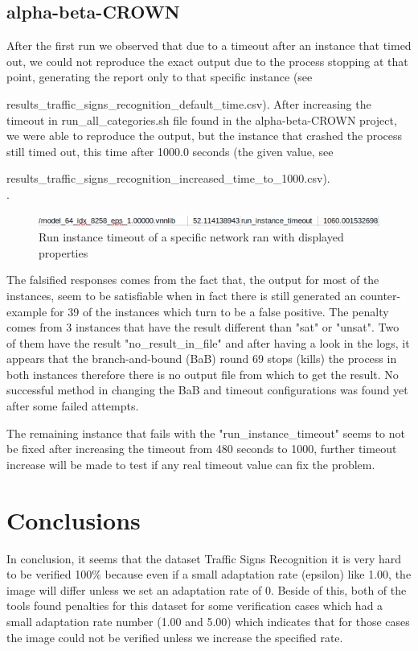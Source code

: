 \documentclass[12pt,a4paper]{report}
\newcommand\tab[1][5mm]{\hspace*{#1}}
\begin{document}
\section{alpha-beta-CROWN}
\tab After the first run we observed that due to a timeout after an instance that timed out, we could not reproduce the exact output due to the process stopping at that point, generating the report only to that specific instance (see

results\_traffic\_signs\_recognition\_default\_time.csv\cite{traffic_signs_recognition_first_solution}). After increasing the timeout in run\_all\_categories.sh file found in the alpha-beta-CROWN project, we were able to reproduce the output, but the instance that crashed the process still timed out, this time after 1000.0 seconds (the given value, see

results\_traffic\_signs\_recognition\_increased\_time\_to\_1000.csv\cite{traffic_signs_recognition_second_solution}).\\

.

\begin{figure}[h]
\centering
\includegraphics[scale=0.6]{run_instance_timeout.png}
\caption{Run instance timeout of a specific network ran with displayed properties}
\end{figure}

The falsified responses comes from the fact that, the output for most of the instances, seem to be satisfiable when in fact there is still generated an counter-example for 39 of the instances which turn to be a false positive. The penalty comes from 3 instances that have the result different than "sat" or "unsat". Two of them have the result "no\_result\_in\_file" and after having a look in the logs, it appears that the branch-and-bound (BaB) round 69 stops (kills) the process in both instances therefore there is no output file from which to get the result. No successful method in changing the BaB and timeout configurations was found yet after some failed attempts.

The remaining instance that fails with the "run\_instance\_timeout" seems to not be fixed after increasing the timeout from 480 seconds to 1000, further timeout increase will be made to test if any real timeout value can fix the problem.

\chapter{Conclusions}
\tab In conclusion, it seems that the dataset Traffic Signs Recognition\cite{traffic_signs_recognition} it is very hard to be verified 100\% because even if a small adaptation rate (epsilon) like 1.00, the image will differ unless we set an adaptation rate of 0. Beside of this, both of the tools found penalties for this dataset for some verification cases which had a small adaptation rate number (1.00 and 5.00) which indicates that for those cases the image could not be verified unless we increase the specified rate.
\end{document}
